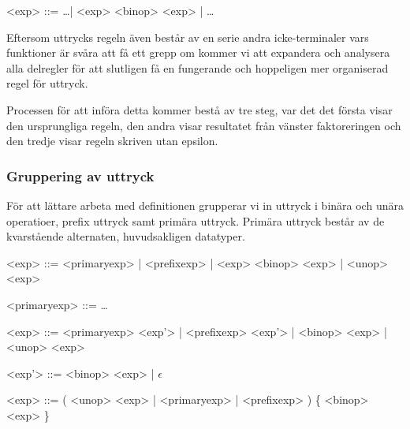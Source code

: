 \setlength{\grammarindent}{5em}
\begin{grammar}
  \singlespace\small%
  \selectfont
  <exp> ::= \ldots | <exp> <binop> <exp> | \ldots
\end{grammar}

Eftersom uttrycks regeln även består av en serie andra icke-terminaler vars
funktioner är svåra att få ett grepp om kommer vi att expandera och analysera
alla delregler för att slutligen få en fungerande och hoppeligen mer
organiserad regel för uttryck.

Processen för att införa detta kommer bestå av tre steg, var det det första
visar den ursprungliga regeln, den andra visar resultatet från vänster
faktoreringen och den tredje visar regeln skriven utan epsilon.

\subsubsection{Gruppering av uttryck}

För att lättare arbeta med definitionen grupperar vi in uttryck i binära och
unära operatioer, prefix uttryck samt primära uttryck. Primära uttryck består
av de kvarstående alternaten, huvudsakligen datatyper.

\begin{description}
  \setlength{\grammarindent}{5em}
  \item[Ursprungsregel] \hfill
    \begin{grammar}
      \singlespace\small%
      \selectfont
      <exp> ::= <primaryexp> | <prefixexp> | <exp> <binop> <exp> | <unop> <exp>

      <primaryexp> ::= \ldots
    \end{grammar}

  \item[Eliminering av vänster rekursion] \hfill
    \begin{grammar}
      \singlespace\small%
      \selectfont
      <exp> ::= <primaryexp> <exp'> | <prefixexp> <exp'> | <binop> <exp> | <unop> <exp>

      <exp'> ::= <binop> <exp> | $\epsilon$
    \end{grammar}

  \item[Resultat] \hfill
    \begin{grammar}
      \singlespace\small%
      \selectfont
      <exp> ::= ( <unop> <exp> | <primaryexp> | <prefixexp> ) \{ <binop> <exp> \}
    \end{grammar}
\end{description}


